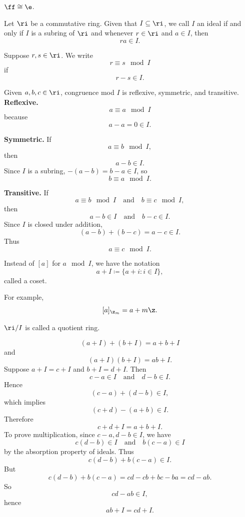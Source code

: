 \begin{axiom}{
$\ff\cong \e$.
}
\end{axiom}

\begin{definition}[Ideal]
Let $\ri$ be a commutative ring.
Given that $I\subseteq \ri$, we call $I$ an ideal if and only if $I$ is a subring of $\ri$ and whenever $r\in \ri$ and $a\in I$, then
\[
ra\in I.
\]
\end{definition}

\begin{definition}
Suppose $r,s\in \ri$.
We write
\[
r\equiv s\mod I
\]
if
\[
r-s\in I.
\]
\end{definition}

\begin{theorem}{
Given $a,b,c\in \ri$, congruence mod $I$ is reflexive, symmetric, and transitive.
}
\textbf{Reflexive.}
\[
a\equiv a\mod I
\]
because
\[
a-a=0\in I.
\]

\textbf{Symmetric.}
If
\[
a\equiv b\mod I,
\]
then
\[
a-b\in I.
\]
Since $I$ is a subring, $-(a-b)=b-a\in I$, so
\[
b\equiv a\mod I.
\]

\textbf{Transitive.}
If
\[
a\equiv b\mod I
\quad\text{and}\quad
b\equiv c\mod I,
\]
then
\[
a-b\in I
\quad\text{and}\quad
b-c\in I.
\]
Since $I$ is closed under addition,
\[
(a-b)+(b-c)=a-c\in I.
\]
Thus
\[
a\equiv c\mod I.
\]
\end{theorem}

\begin{definition}[Coset]
Instead of $[a]$ for $a\mod I$, we have the notation
\[
a+I\coloneqq \{a+i:i\in I\},
\]
called a coset.
\end{definition}

For example,
\[
[a]_{\z_m}=a+m\z.
\]

\begin{definition}
$\ri/I$ is called a quotient ring.
\end{definition}

\begin{theorem}{
\[
(a+I)+(b+I)=a+b+I
\]
and
\[
(a+I)(b+I)=ab+I.
\]
}
Suppose $a+I=c+I$ and $b+I=d+I$.
Then
\[
c-a\in I
\quad\text{and}\quad
d-b\in I.
\]
Hence
\[
(c-a)+(d-b)\in I,
\]
which implies
\[
(c+d)-(a+b)\in I.
\]
Therefore
\[
c+d+I=a+b+I.
\]
To prove multiplication, since $c-a,d-b\in I$, we have
\[
c(d-b)\in I
\quad\text{and}\quad
b(c-a)\in I
\]
by the absorption property of ideals.
Thus
\[
c(d-b)+b(c-a)\in I.
\]
But
\[
c(d-b)+b(c-a)=cd-cb+bc-ba=cd-ab.
\]
So
\[
cd-ab\in I,
\]
hence
\[
ab+I=cd+I.
\]
\end{theorem}

